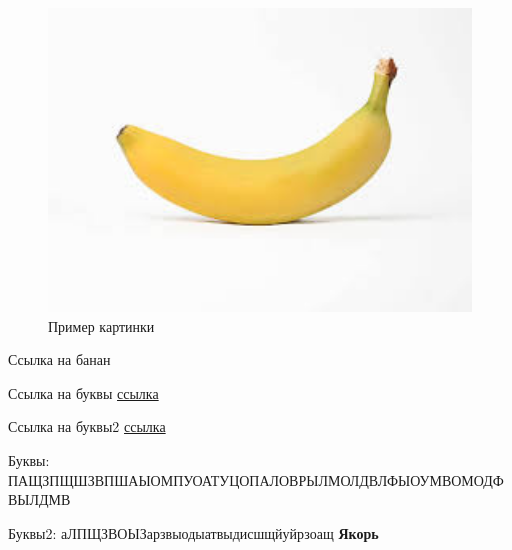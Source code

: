 \documentclass[10pt, a4paper]{article}
\begin{document}
\begin{figure}[H]
    \centering
    \includegraphics[width=15cm]{imagebanan.jpg}
    \caption{Пример картинки}
    \label{Fig. 1}
\end{figure}

\clearpage

Ссылка на банан\pageref{Fig. 1}

Ссылка на буквы \hyperref[Bukvi1]{ссылка}

Ссылка на буквы2 \hyperlink{bukvi2}{ссылка}

\clearpage

Буквы: ПАЩЗПЩШЗВПШАЫОМПУОАТУЦОПАЛОВРЫЛМОЛДВЛФЫОУМВОМОДФВЫЛДМВ\label{Bukvi1}

Буквы2: аЛПЩЗВОЫЗарзвыодыатвыдисшщйуйрзоащ \hypertarget{bukvi2}{\textbf{Якорь}}
\end{document}
